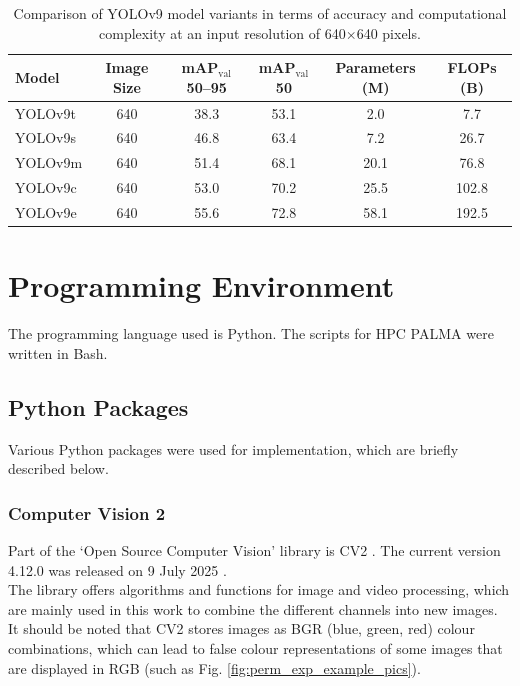 \begin{table}[h]
\centering
\begin{tabular}{l|c|c|c|c|c} %
\textbf{Model} & \textbf{Image Size} & \textbf{mAP$_{\text{val}}$ 50--95} & \textbf{mAP$_{\text{val}}$ 50} & \textbf{Parameters (M)} & \textbf{FLOPs (B)} \\
\hline
YOLOv9t & 640 & 38.3 & 53.1 & 2.0 & 7.7 \\
YOLOv9s & 640 & 46.8 & 63.4 & 7.2 & 26.7 \\
YOLOv9m & 640 & 51.4 & 68.1 & 20.1 & 76.8 \\
YOLOv9c & 640 & 53.0 & 70.2 & 25.5 & 102.8 \\
YOLOv9e & 640 & 55.6 & 72.8 & 58.1 & 192.5 \\
\end{tabular}
\caption{Comparison of YOLOv9 model variants in terms of accuracy and computational complexity at an input resolution of 640$\times$640 pixels. \cite{ultralyics_yolov9,wang2024_sapkota}}
\label{tab:yolov9-models}
\end{table}





\section{Programming Environment}
The programming language used is Python. The scripts for \acrshort{HPC} \acrshort{PALMA} were written in Bash.

\subsection{Python Packages}
Various Python packages were used for implementation, which are briefly described below.
 
\subsubsection{Computer Vision 2}
Part of the ‘Open Source Computer Vision’ library is \Acrfull{CV2} \cite{opencv_about}. The current version 4.12.0 was released on 9 July 2025 \cite{opencv_release}. \\
The library offers algorithms and functions for image and video processing, which are mainly used in this work to combine the different channels into new images. It should be noted that \acrshort{CV2} stores images as BGR (blue, green, red) colour combinations, which can lead to false colour representations of some images that are displayed in RGB (such as Fig. \ref{fig:perm_exp_example_pics}).
